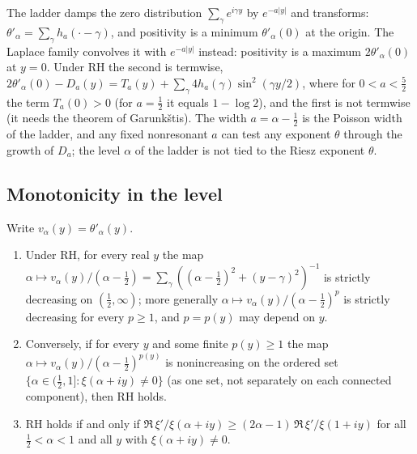 The ladder damps the zero distribution $\sum_\gamma e^{i\gamma y}$ by $e^{-a|y|}$ and transforms: $\theta'_\alpha=\sum_\gamma h_a(\cdot-\gamma)$, and positivity is a minimum $\theta'_\alpha(0)$ at the origin. The Laplace family convolves it with $e^{-a|y|}$ instead: positivity is a maximum $2\theta'_\alpha(0)$ at $y=0$. Under RH the second is termwise, $2\theta'_\alpha(0)-D_a(y)=T_a(y)+\sum_\gamma4h_a(\gamma)\sin^2(\gamma y/2)$, where for $0<a<\tfrac52$ the term $T_a(0)>0$ (for $a=\tfrac12$ it equals $1-\log2$), and the first is not termwise (it needs the theorem of Garunk\v{s}tis). The width $a=\alpha-\tfrac12$ is the Poisson width of the ladder, and any fixed nonresonant $a$ can test any exponent $\theta$ through the growth of $D_a$; the level $\alpha$ of the ladder is not tied to the Riesz exponent $\theta$.

\subsection{Monotonicity in the level}

\begin{theorem}\label{qt:thm:ratio}
Write $v_\alpha(y)=\theta'_\alpha(y)$.
\begin{enumerate}
\item Under RH, for every real $y$ the map $\alpha\mapsto v_\alpha(y)/(\alpha-\tfrac12)=\sum_\gamma((\alpha-\tfrac12)^2+(y-\gamma)^2)^{-1}$ is strictly decreasing on $(\tfrac12,\infty)$; more generally $\alpha\mapsto v_\alpha(y)/(\alpha-\tfrac12)^p$ is strictly decreasing for every $p\ge1$, and $p=p(y)$ may depend on $y$.
\item Conversely, if for every $y$ and some finite $p(y)\ge1$ the map $\alpha\mapsto v_\alpha(y)/(\alpha-\tfrac12)^{p(y)}$ is nonincreasing on the ordered set $\{\alpha\in(\tfrac12,1]:\xi(\alpha+iy)\ne0\}$ (as one set, not separately on each connected component), then RH holds.
\item RH holds if and only if $\Re\,\xi'/\xi(\alpha+iy)\ge(2\alpha-1)\,\Re\,\xi'/\xi(1+iy)$ for all $\tfrac12<\alpha<1$ and all $y$ with $\xi(\alpha+iy)\ne0$.
\end{enumerate}
\end{theorem}

